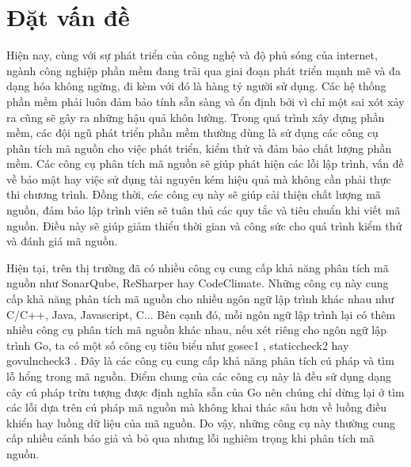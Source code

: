 \chapter{Đặt vấn đề}
\label{chap:introduction}

Hiện nay, cùng với sự phát triển của công nghệ và độ phủ sóng của internet, ngành
công nghiệp phần mềm đang trải qua giai đoạn phát triển mạnh mẽ và đa dạng hóa không
ngừng, đi kèm với đó là hàng tỷ người sử dụng. Các hệ thống phần mềm phải luôn đảm
bảo tính sẵn sàng và ổn định bởi vì chỉ một sai xót xảy ra cũng sẽ gây ra những hậu
quả khôn lường. Trong quá trình xây dựng phần mềm, các đội ngũ phát triển phần mềm
thường dùng là sử dụng các công cụ phân tích mã nguồn cho việc
phát triển, kiểm thử và đảm bảo chất lượng phần mềm. Các công cụ phân tích mã nguồn
sẽ giúp phát hiện các lỗi lập trình, vấn đề về bảo mật hay việc sử dụng tài nguyên kém
hiệu quả mà không cần phải thực thi chương trình. Đồng thời, các công cụ này sẽ giúp
cải thiện chất lượng mã nguồn, đảm bảo lập trình viên sẽ tuân thủ các quy tắc và tiêu
chuẩn khi viết mã nguồn. Điều này sẽ giúp giảm thiểu thời gian và công sức cho quá
trình kiểm thử và đánh giá mã nguồn.

Hiện tại, trên thị trường đã có nhiều công cụ cung cấp khả năng phân tích mã nguồn
như SonarQube, ReSharper hay CodeClimate. Những công cụ này cung cấp khả năng
phân tích mã nguồn cho nhiều ngôn ngữ lập trình khác nhau như C/C++, Java, Javascript,
C... Bên cạnh đó, mỗi ngôn ngữ lập trình lại có thêm nhiều công cụ phân tích mã nguồn
khác nhau, nếu xét riêng cho ngôn ngữ lập trình Go, ta có một số công cụ tiêu biểu như
gosec1 , staticcheck2 hay govulncheck3 . Đây là các công cụ cung cấp khả năng phân tích
cú pháp và tìm lỗ hổng trong mã nguồn. Điểm chung của các công cụ này là đều sử dụng dạng cây cú pháp trừu tượng được định nghĩa sẵn của Go nên chúng chỉ dừng lại ở tìm
các lỗi dựa trên cú pháp mã nguồn mà không khai thác sâu hơn về luồng điều khiển hay
luồng dữ liệu của mã nguồn. Do vậy, những công cụ này thường cung cấp nhiều cảnh
báo giả và bỏ qua nhưng lỗi nghiêm trọng khi phân tích mã nguồn.

